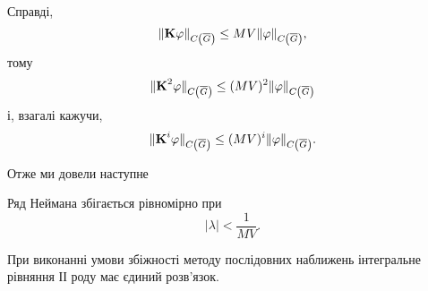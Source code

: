 Справді,
\begin{equation}
	\| \bf{K} \phi\|_{C\left(\overline G\right)} \le MV \|\phi\|_{C\left(\overline G\right)},
\end{equation}
тому
\begin{equation}
	\|\bf{K}^2\phi\|_{C\left(\overline G\right)} \le (MV)^2 \|\phi\|_{C\left(\overline G\right)}
\end{equation} 
і, взагалі кажучи,
\begin{equation}
	\|\bf{K}^i\phi\|_{C\left(\overline G\right)} \le (MV)^i \|\phi\|_{C\left(\overline G\right)}.
\end{equation}

Отже ми довели наступне
\begin{proposition}
	Ряд Неймана збігається рівномірно при 	
	\begin{equation}
		|\lambda| < \dfrac{1}{MV}.
	\end{equation} 
\end{proposition}

\begin{lemma}
	При виконанні умови збіжності методу послідовних наближень інтегральне рівняння ІІ роду має єдиний розв'язок.
\end{lemma}

